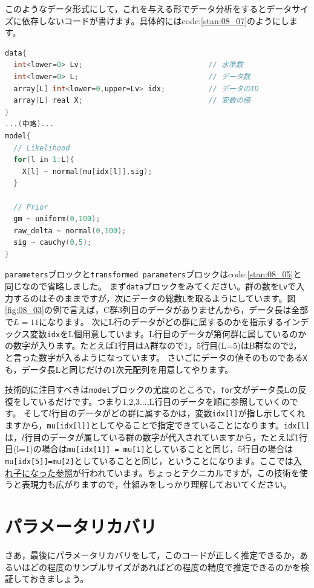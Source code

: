 \documentclass{ltjsbook}
\begin{document}
このようなデータ形式にして，これを与える形でデータ分析をするとデータサイズに依存しないコードが書けます。具体的にはcode:\ref{stan:08_07}のようにします。
\begin{lstlisting}[language=C++,label={stan:08_07},caption={整然データに対応したコード}]
data{
  int<lower=0> Lv;                             // 水準数
  int<lower=0> L;                              // データ数
  array[L] int<lower=0,upper=Lv> idx;          // データのID
  array[L] real X;                             // 変数の値
}
...(中略)...
model{
  // Likelihood
  for(l in 1:L){
    X[l] ~ normal(mu[idx[l]],sig);
  }
    
  // Prior
  gm ~ uniform(0,100);
  raw_delta ~ normal(0,100);
  sig ~ cauchy(0,5);
}
\end{lstlisting}

\verb|parameters|ブロックと\verb|transformed parameters|ブロックはcode:\ref{stan:08_05}と同じなので省略しました。
まず\verb|data|ブロックをみてください。群の数を\verb|Lv|で入力するのはそのままですが，次にデータの総数\verb|L|を取るようにしています。図\ref{fig:08_03}の例で言えば，C群3列目のデータがありませんから，データ長は全部で$L=11$になります。
次にL行のデータがどの群に属するのかを指示するインデックス変数\verb|idx|をL個用意しています。L行目のデータが第何群に属しているのかの数字が入ります。たとえば1行目はA群なので1，5行目(L=5)はB群なので2，と言った数字が入るようになっています。
さいごにデータの値そのものである\verb|X|も，データ長Lと同じだけの1次元配列を用意してやります。

技術的に注目すべきは\verb|model|ブロックの尤度のところで，\verb|for|文がデータ長Lの反復をしているだけです。つまり1,2,3...,L行目のデータを順に参照していくのです。
そして$l$行目のデータがどの群に属するかは，変数\verb|idx[l]|が指し示してくれますから，\verb|mu[idx[l]]|としてやることで指定できていることになります。\verb|idx[l]|は，$l$行目のデータが属している群の数字が代入されていますから，たとえば1行目(l=1)の場合は\verb|mu[idx[1]] = mu[1]|としていることと同じ，5行目の場合は\verb|mu[idx[5]]=mu[2]|としていることと同じ，ということになります。ここでは\underline{入れ子になった参照}が行われています。ちょっとテクニカルですが，この技術を使うと表現力も広がりますので，仕組みをしっかり理解しておいてください。

\section{パラメータリカバリ}
さあ，最後にパラメータリカバリをして，このコードが正しく推定できるか，あるいはどの程度のサンプルサイズがあればどの程度の精度で推定できるのかを検証しておきましょう。
\end{document}
